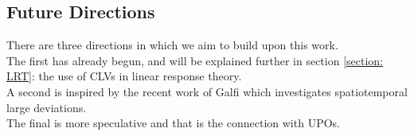 \subsection{Future Directions} \label{subsection: Lyapunov future}

There are three directions in which we aim to build upon this work.\\

The first has already begun, and will be explained further in section \ref{section: LRT}: the use of CLVs in linear response theory.\\

A second is inspired by the recent work of Galfi \cite{Galfi2019} which investigates spatiotemporal large deviations.\\

The final is more speculative and that is the connection with UPOs.
